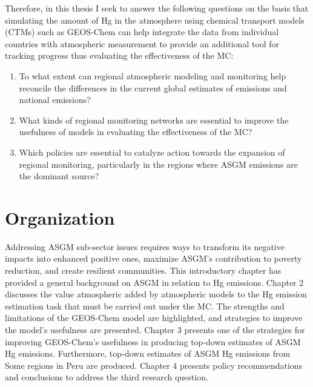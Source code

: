 Therefore, in this thesis I seek to answer the following questions on the basis that simulating the amount of Hg in the atmosphere using chemical transport models (CTMs) such as GEOS-Chem can help integrate the data from individual countries with atmospheric measurement to provide an additional tool for tracking progress thus evaluating the effectiveness of the MC:
\begin{enumerate}
  \item To what extent can regional atmospheric modeling and monitoring help reconcile the differences in the current global estimates of emissions and national emissions?
  \item What kinds of regional monitoring networks are essential to improve the usefulness of models in evaluating the effectiveness of the MC?
  \item Which policies are essential to catalyze action towards the expansion of regional monitoring, particularly in the regions where ASGM emissions are the dominant source?
\end{enumerate}




 
\section{Organization}
Addressing ASGM sub-sector issues requires ways to transform its negative impacts into enhanced positive ones, maximize ASGM's contribution to poverty reduction, and create resilient communities. This introductory chapter has provided a general background on ASGM in relation to Hg emissions. Chapter 2 discusses the value atmospheric added by atmospheric models to the Hg emission estimation task that must be carried out under the MC. The strengths and limitations of the GEOS-Chem model are highlighted, and strategies to improve the model's usefulness are presented. Chapter 3 presents one of the strategies for improving GEOS-Chem's usefulness in producing top-down estimates of ASGM Hg emissions. Furthermore, top-down estimates of ASGM Hg emissions from Some regions in Peru are produced. Chapter 4 presents policy recommendations and conclusions to address the third research question.



